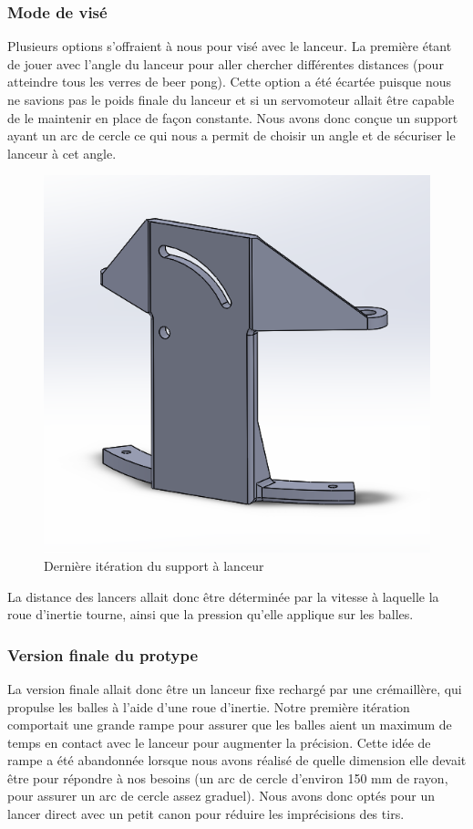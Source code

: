\subsubsection{Mode de visé}
Plusieurs options s’offraient à nous pour visé avec le lanceur.
La première étant de jouer avec l’angle du lanceur pour aller chercher différentes distances (pour atteindre tous les verres de beer pong).
Cette option a été écartée puisque nous ne savions pas le poids finale du lanceur et si un servomoteur allait être capable de le maintenir en place de façon constante.
Nous avons donc conçue un support ayant un arc de cercle ce qui nous a permit de choisir un angle et de sécuriser le lanceur à cet angle.

\begin{figure}[h!]
    \centering
    \includegraphics[width=0.5\linewidth]{img/s2/cad/support}
    \caption{Dernière itération du support à lanceur}
    \label{fig:s2-cad-support}
\end{figure}

La distance des lancers allait donc être déterminée par la vitesse à laquelle la roue d’inertie tourne, ainsi que la pression qu’elle applique sur les balles.

\subsubsection{Version finale du protype}
La version finale allait donc être un lanceur fixe rechargé par une crémaillère, qui propulse les balles à l’aide d’une roue d’inertie.
Notre première itération comportait une grande rampe pour assurer que les balles aient un maximum de temps en contact avec le lanceur pour augmenter la précision.
Cette idée de rampe a été abandonnée lorsque nous avons réalisé de quelle dimension elle devait être pour répondre à nos besoins (un arc de cercle d’environ 150 mm de rayon, pour assurer un arc de cercle assez graduel).
Nous avons donc optés pour un lancer direct avec un petit canon pour réduire les imprécisions des tirs.

